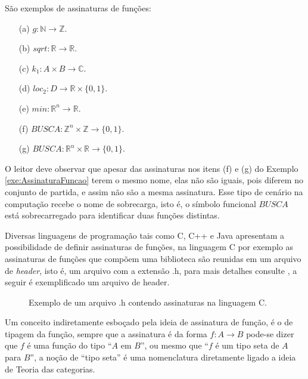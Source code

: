 \begin{example}\label{exe:AssinaturaFuncao}
	São exemplos de assinaturas de funções:
	\begin{itemize}
		\item[(a)] $g : \mathbb{N} \rightarrow \mathbb{Z}$.
		\item[(b)] $sqrt : \mathbb{R} \rightarrow \mathbb{R}$.
		\item[(c)] $k_1 : A \times B \rightarrow \mathbb{C}$.
		\item[(d)] $loc_2 : D \rightarrow \mathbb{R} \times \{0,1\}$.
		\item[(e)] $min : \mathbb{R}^n \rightarrow \mathbb{R}$.
		\item[(f)] $BUSCA : \mathbb{Z}^n \times \mathbb{Z} \rightarrow \{0,1\}$.
		\item[(g)] $BUSCA : \mathbb{R}^n \times \mathbb{R} \rightarrow \{0,1\}$.
	\end{itemize}
\end{example}

\begin{remark}
	O leitor deve observar que apesar das assinaturas nos itens (f) e (g) do Exemplo \ref{exe:AssinaturaFuncao} terem o mesmo nome, elas não são iguais, pois diferem no conjunto de partida, e assim não são a mesma assinatura. Esse tipo de cenário na computação recebe o nome de sobrecarga, isto é, o símbolo funcional $BUSCA$ está sobrecarregado para identificar duas funções distintas.
\end{remark}

Diversas linguagens de programação tais como C, C++ e Java apresentam a possibilidade de definir assinaturas de funções, na linguagem C por exemplo as assinaturas de funções que compõem uma biblioteca são reunidas em um arquivo de \textit{header}, isto é, um arquivo com a extensão .h, para mais detalhes consulte \cite{paulo2009algoritmos}, a seguir é exemplificado um arquivo de header.

\begin{figure}[h]
	
	\caption{Exemplo de um arquivo .h contendo assinaturas na linguagem C.}
	\label{fig:AssinaturasEmC}
\end{figure}

Um conceito indiretamente esboçado pela ideia de assinatura de função, é o de tipagem da função, sempre que a assinatura é da forma $f: A \rightarrow B$ pode-se dizer que $f$ é uma função do tipo ``$A$ em $B$'', ou mesmo que ``$f$ é um tipo seta de $A$ para $B$'', a noção de ``tipo seta'' é uma nomenclatura diretamente ligado a ideia de Teoria das categorias.

